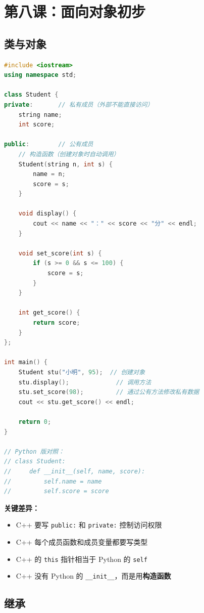 \documentclass[a4paper,12pt]{ctexart}
\begin{document}
\section*{第八课：面向对象初步}

\subsection*{类与对象}

\begin{lstlisting}[language=C++]
#include <iostream>
using namespace std;

class Student {
private:       // 私有成员（外部不能直接访问）
    string name;
    int score;

public:        // 公有成员
    // 构造函数（创建对象时自动调用）
    Student(string n, int s) {
        name = n;
        score = s;
    }
    
    void display() {
        cout << name << "：" << score << "分" << endl;
    }
    
    void set_score(int s) {
        if (s >= 0 && s <= 100) {
            score = s;
        }
    }
    
    int get_score() {
        return score;
    }
};

int main() {
    Student stu("小明", 95);  // 创建对象
    stu.display();             // 调用方法
    stu.set_score(98);         // 通过公有方法修改私有数据
    cout << stu.get_score() << endl;
    
    return 0;
}

// Python 版对照：
// class Student:
//     def __init__(self, name, score):
//         self.name = name
//         self.score = score
\end{lstlisting}

\textbf{关键差异：}
\begin{itemize}
  \item C++ 要写 \texttt{public:} 和 \texttt{private:} 控制访问权限
  \item C++ 每个成员函数和成员变量都要写类型
  \item C++ 的 \texttt{this} 指针相当于 Python 的 \texttt{self}
  \item C++ 没有 Python 的 \texttt{\_\_init\_\_}，而是用\textbf{构造函数}
\end{itemize}

\subsection*{继承}
\end{document}

